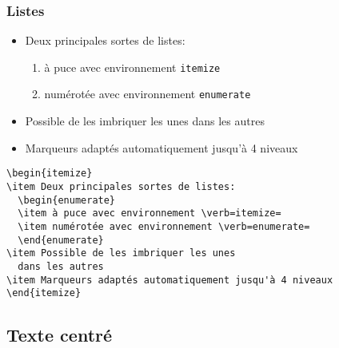 \begin{frame}[fragile]
  \frametitle{Listes}
  \begin{itemize}
  \item Deux principales sortes de listes:
    \begin{enumerate}
    \item \alert{à puce} avec environnement \verb=itemize=
    \item \alert{numérotée} avec environnement \verb=enumerate=
    \end{enumerate}
  \item Possible de les imbriquer les unes dans les autres
  \item Marqueurs adaptés automatiquement jusqu'à 4 niveaux
  \end{itemize}
  \pause

\begin{lstlisting}
\begin{itemize}
\item Deux principales sortes de listes:
  \begin{enumerate}
  \item à puce avec environnement \verb=itemize=
  \item numérotée avec environnement \verb=enumerate=
  \end{enumerate}
\item Possible de les imbriquer les unes
  dans les autres
\item Marqueurs adaptés automatiquement jusqu'à 4 niveaux
\end{itemize}
\end{lstlisting}
\end{frame}

\subsection{Texte centré}


